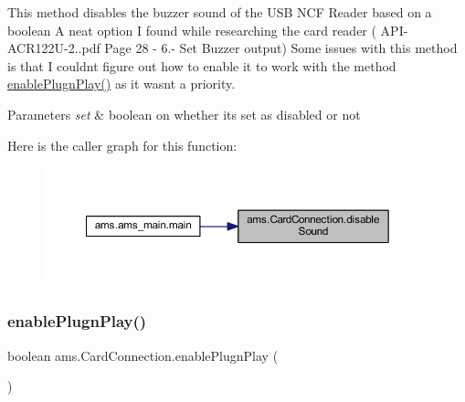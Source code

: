 This method disables the buzzer sound of the U\+SB N\+CF Reader based on a boolean A neat option I found while researching the card reader ( A\+P\+I-\/\+A\+C\+R122\+U-\/2..\+pdf Page 28 -\/ 6.-\/ Set Buzzer output) Some issues with this method is that I couldn\textquotesingle{}t figure out how to enable it to work with the method \mbox{\hyperlink{classams_1_1_card_connection_a84c6991f3340668fe44a3b7122719bb7}{enable\+Plugn\+Play()}} as it wasn\textquotesingle{}t a priority. 
\begin{DoxyParams}{Parameters}
{\em set} & boolean on whether it\textquotesingle{}s set as disabled or not \\
\hline
\end{DoxyParams}
Here is the caller graph for this function\+:\nopagebreak
\begin{figure}[H]
\begin{center}
\leavevmode
\includegraphics[width=350pt]{classams_1_1_card_connection_a9e20e93963b78e6b960dfdd5166504bb_icgraph}
\end{center}
\end{figure}
\mbox{\label{classams_1_1_card_connection_a84c6991f3340668fe44a3b7122719bb7}} 
\subsubsection{\texorpdfstring{enablePlugnPlay()}{enablePlugnPlay()}}
{\footnotesize\ttfamily boolean ams.\+Card\+Connection.\+enable\+Plugn\+Play (\begin{DoxyParamCaption}{ }\end{DoxyParamCaption})}

